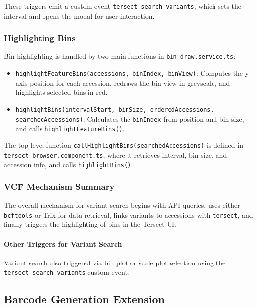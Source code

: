 \documentclass[12pt]{article}
\begin{document}
These triggers emit a custom event \texttt{tersect-search-variants}, which sets the interval and opens the modal for user interaction.

\subsubsection{Highlighting Bins}

Bin highlighting is handled by two main functions in \texttt{bin-draw.service.ts}:

\begin{itemize}
  \item \texttt{highlightFeatureBins(accessions, binIndex, binView)}: Computes the y-axis position for each accession, redraws the bin view in greyscale, and highlights selected bins in red.
  \item \texttt{highlightBins(intervalStart, binSize, orderedAccessions, searchedAccessions)}: Calculates the \texttt{binIndex} from position and bin size, and calls \texttt{highlightFeatureBins()}.
\end{itemize}

The top-level function \texttt{callHighlightBins(searchedAccessions)} is defined in \texttt{tersect-browser.component.ts}, where it retrieves interval, bin size, and accession info, and calls \texttt{highlightBins()}.

\subsubsection{VCF Mechanism Summary}

The overall mechanism for variant search begins with API queries, uses either \texttt{bcftools} or Trix for data retrieval, links variants to accessions with \texttt{tersect}, and finally triggers the highlighting of bins in the Tersect UI.

\paragraph{Other Triggers for Variant Search}
Variant search also triggered via bin plot or scale plot selection using the \texttt{tersect-search-variants} custom event.

\clearpage



\subsection{Barcode Generation Extension}
\end{document}
